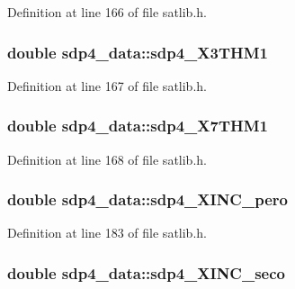 Definition at line 166 of file satlib.\-h.

\hypertarget{structsdp4__data_ac2822d28386168be52e61de132419d35}{
\subsubsection[{sdp4\-\_\-\-X3\-T\-H\-M1}]{\setlength{\rightskip}{0pt plus 5cm}double sdp4\-\_\-data\-::sdp4\-\_\-\-X3\-T\-H\-M1}}\label{structsdp4__data_ac2822d28386168be52e61de132419d35}


Definition at line 167 of file satlib.\-h.

\hypertarget{structsdp4__data_a04fc61c6b73948f030f0cba20af2a0b9}{
\subsubsection[{sdp4\-\_\-\-X7\-T\-H\-M1}]{\setlength{\rightskip}{0pt plus 5cm}double sdp4\-\_\-data\-::sdp4\-\_\-\-X7\-T\-H\-M1}}\label{structsdp4__data_a04fc61c6b73948f030f0cba20af2a0b9}


Definition at line 168 of file satlib.\-h.

\hypertarget{structsdp4__data_a6c35626ec01910d7ef0a51aff58412ea}{
\subsubsection[{sdp4\-\_\-\-X\-I\-N\-C\-\_\-pero}]{\setlength{\rightskip}{0pt plus 5cm}double sdp4\-\_\-data\-::sdp4\-\_\-\-X\-I\-N\-C\-\_\-pero}}\label{structsdp4__data_a6c35626ec01910d7ef0a51aff58412ea}


Definition at line 183 of file satlib.\-h.

\hypertarget{structsdp4__data_a3f9d92fb7fd3af258a6e5e195aad4155}{
\subsubsection[{sdp4\-\_\-\-X\-I\-N\-C\-\_\-seco}]{\setlength{\rightskip}{0pt plus 5cm}double sdp4\-\_\-data\-::sdp4\-\_\-\-X\-I\-N\-C\-\_\-seco}}\label{structsdp4__data_a3f9d92fb7fd3af258a6e5e195aad4155}


